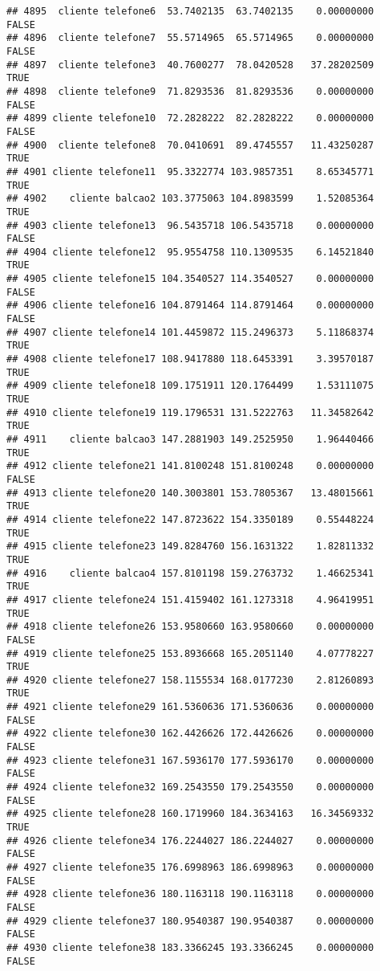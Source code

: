 \documentclass[
]{article}
\begin{document}
\begin{verbatim}
## 4895  cliente telefone6  53.7402135  63.7402135    0.00000000    FALSE
## 4896  cliente telefone7  55.5714965  65.5714965    0.00000000    FALSE
## 4897  cliente telefone3  40.7600277  78.0420528   37.28202509     TRUE
## 4898  cliente telefone9  71.8293536  81.8293536    0.00000000    FALSE
## 4899 cliente telefone10  72.2828222  82.2828222    0.00000000    FALSE
## 4900  cliente telefone8  70.0410691  89.4745557   11.43250287     TRUE
## 4901 cliente telefone11  95.3322774 103.9857351    8.65345771     TRUE
## 4902    cliente balcao2 103.3775063 104.8983599    1.52085364     TRUE
## 4903 cliente telefone13  96.5435718 106.5435718    0.00000000    FALSE
## 4904 cliente telefone12  95.9554758 110.1309535    6.14521840     TRUE
## 4905 cliente telefone15 104.3540527 114.3540527    0.00000000    FALSE
## 4906 cliente telefone16 104.8791464 114.8791464    0.00000000    FALSE
## 4907 cliente telefone14 101.4459872 115.2496373    5.11868374     TRUE
## 4908 cliente telefone17 108.9417880 118.6453391    3.39570187     TRUE
## 4909 cliente telefone18 109.1751911 120.1764499    1.53111075     TRUE
## 4910 cliente telefone19 119.1796531 131.5222763   11.34582642     TRUE
## 4911    cliente balcao3 147.2881903 149.2525950    1.96440466     TRUE
## 4912 cliente telefone21 141.8100248 151.8100248    0.00000000    FALSE
## 4913 cliente telefone20 140.3003801 153.7805367   13.48015661     TRUE
## 4914 cliente telefone22 147.8723622 154.3350189    0.55448224     TRUE
## 4915 cliente telefone23 149.8284760 156.1631322    1.82811332     TRUE
## 4916    cliente balcao4 157.8101198 159.2763732    1.46625341     TRUE
## 4917 cliente telefone24 151.4159402 161.1273318    4.96419951     TRUE
## 4918 cliente telefone26 153.9580660 163.9580660    0.00000000    FALSE
## 4919 cliente telefone25 153.8936668 165.2051140    4.07778227     TRUE
## 4920 cliente telefone27 158.1155534 168.0177230    2.81260893     TRUE
## 4921 cliente telefone29 161.5360636 171.5360636    0.00000000    FALSE
## 4922 cliente telefone30 162.4426626 172.4426626    0.00000000    FALSE
## 4923 cliente telefone31 167.5936170 177.5936170    0.00000000    FALSE
## 4924 cliente telefone32 169.2543550 179.2543550    0.00000000    FALSE
## 4925 cliente telefone28 160.1719960 184.3634163   16.34569332     TRUE
## 4926 cliente telefone34 176.2244027 186.2244027    0.00000000    FALSE
## 4927 cliente telefone35 176.6998963 186.6998963    0.00000000    FALSE
## 4928 cliente telefone36 180.1163118 190.1163118    0.00000000    FALSE
## 4929 cliente telefone37 180.9540387 190.9540387    0.00000000    FALSE
## 4930 cliente telefone38 183.3366245 193.3366245    0.00000000    FALSE

\end{verbatim}
\end{document}
